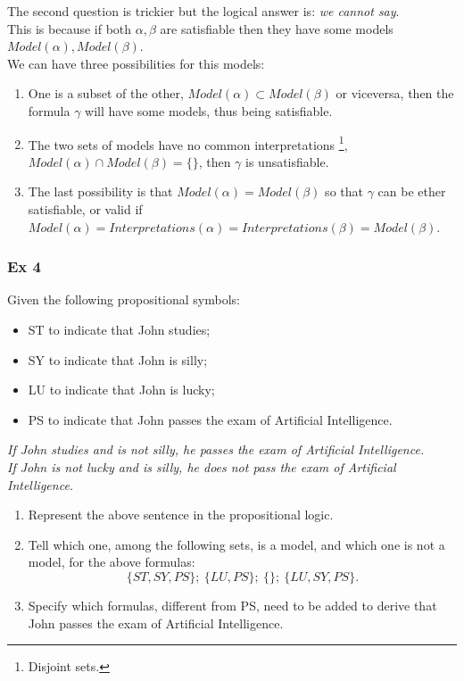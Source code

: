 \documentclass[10pt,a4paper]{article}
\begin{document}
\begin{enumerate}
The second question is trickier but the logical answer is: \textit{we cannot say}.\\
This is because if both $\alpha,\beta$ are satisfiable then they have some models $Model(\alpha),Model(\beta)$.\\ 
We can have three possibilities for this models:
\begin{enumerate}
\item One is a subset of the other, $Model(\alpha)\subset Model(\beta)$ or viceversa, then the formula  $\gamma$ will have some models, thus being satisfiable.
\item The two sets of models have no common interpretations \footnote{Disjoint sets.}, $Model(\alpha)\cap Model(\beta)=\{\}$, then $\gamma$ is unsatisfiable.
\item The last possibility is that  $Model(\alpha)= Model(\beta)$ so that $\gamma$ can be ether satisfiable, or valid if $Model(\alpha)=Interpretations(\alpha)=Interpretations(\beta)=Model(\beta)$.
\end{enumerate}

\subsubsection{Ex 4}
Given the following propositional symbols:
\begin{itemize}
\item ST to indicate that John studies;
\item SY to indicate that John is silly;
\item LU to indicate that John is lucky;
\item PS to indicate that John passes the exam of Artificial Intelligence.
\end{itemize}
\begin{center}
\textit{If John studies and is not silly, he passes the exam of Artificial Intelligence.\\
If John is not lucky and is silly, he does not pass the exam of Artificial Intelligence.}
\end{center}

\begin{enumerate}
\item Represent the above sentence in the propositional logic.
\item Tell which one, among the following sets, is a model, and which one is not a model, for the above formulas:
\[\lbrace ST,SY,PS\rbrace;\ \lbrace LU,PS\rbrace;\ \lbrace \rbrace;\ \lbrace LU,SY,PS\rbrace.\]
\item Specify which formulas, different from PS, need to be added to derive that John passes the exam of Artificial Intelligence.
\end{enumerate}


\end{enumerate}
\end{document}
